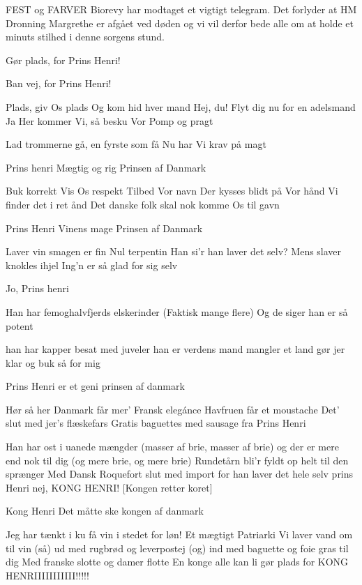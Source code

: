 \documentclass[a4paper,11pt]{article}
\begin{document}
\begin{song}
\scene FEST og FARVER 
 Biorevy har modtaget et vigtigt telegram. Det forlyder at HM Dronning Margrethe er afgået ved døden og vi vil derfor bede alle om at holde et minuts stilhed i denne sorgens stund.

 Gør plads, for Prins Henri!

 Ban vej, for Prins Henri!

Plads, giv Os plads
Og kom hid hver mand
Hej, du! Flyt dig nu for en adelsmand
Ja Her kommer Vi, så besku Vor Pomp og pragt

Lad trommerne gå, en fyrste som få
Nu har Vi krav på magt

Prins henri
Mægtig og rig
Prinsen af Danmark

Buk korrekt
Vis Os respekt
Tilbed Vor navn
Der kysses blidt på Vor hånd
Vi finder det i ret ånd
Det danske folk skal nok komme Os til gavn

Prins Henri
Vinens mage
Prinsen af Danmark

Laver vin
smagen er fin
Nul terpentin
 Han si’r han laver det selv?
 Mens slaver knokles ihjel
 Ing’n er så glad for sig selv

Jo, Prins henri

 Han har femoghalvfjerds elskerinder
(Faktisk mange flere)
 Og de siger han er så potent

han har kapper besat med juveler
han er verdens mand
mangler et land
gør jer klar og buk så for mig

Prins Henri
er et geni
prinsen af danmark

Hør så her
Danmark får mer’
Fransk elegánce
Havfruen får et moustache
Det’ slut med jer’s flæskefars
Gratis baguettes med sausage
fra Prins Henri

Han har ost i uanede mængder
(masser af brie, masser af brie)
og der er mere end nok til dig
(og mere brie, og mere brie)
Rundetårn bli’r fyldt op helt til den sprænger
Med Dansk Roquefort 
slut med import
for han laver det hele selv
prins Henri
nej, KONG HENRI! [Kongen retter koret]

Kong Henri
Det måtte ske
kongen af danmark

Jeg har tænkt i ku få vin i stedet for løn!
Et mægtigt Patriarki
Vi laver vand om til vin
(så) ud med rugbrød
og leverpostej
(og) ind med baguette
og foie gras til dig
Med franske slotte og damer flotte
En konge alle kan li
gør plads for KONG HENRIIIIIIIIIII!!!!!

\end{song}
\end{document}
